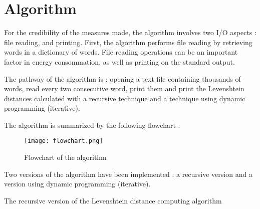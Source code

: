 \section{Algorithm}
\label{sec:Algorithm}

	For the credibility of the measures made, the algorithm involves two I/O aspects : file reading, and printing. First, the algorithm performs file reading by retrieving words in a dictionary of words. File reading operations can be an important factor in energy consommation, as well as printing on the standard output.
	
	The pathway of the algorithm is : opening a text file containing thousands of words, read every two consecutive word, print them and print the Levenshtein distances calculated with a recursive technique and a technique using dynamic programming (iterative). 

The algorithm is summarized by the following flowchart :
\begin{figure}[H]
\centering
\texttt{[image: flowchart.png]}
\caption{Flowchart of the algorithm}
\label{fig:flowchart}
\end{figure}

Two versions of the algorithm have been implemented : a recursive version and a version using dynamic programming (iterative).

\bigskip
{}
\begin{algorithm}[H]
\caption{The recursive version of the Levenshtein distance computing algorithm}
\end{algorithm}

\bigskip

